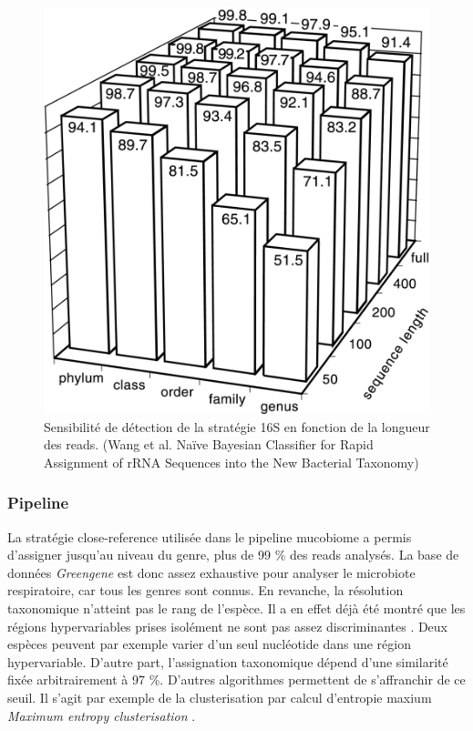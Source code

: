 \documentclass[12pt,a4paper]{article}
\begin{document}
\begin{figure}
\begin{center}
\includegraphics[scale=3]{img/zam.jpg}\hfill
\end{center}
\caption{Sensibilité de détection de la stratégie 16S en fonction de la longueur des reads. (Wang et al. Naïve Bayesian Classifier for Rapid Assignment of rRNA Sequences into the New Bacterial Taxonomy) }
\label{rnasens}
\end{figure}

\subsubsection{Pipeline}
La stratégie close-reference utilisée dans le pipeline mucobiome a permis d'assigner jusqu'au niveau du genre, plus de 99 \% des reads analysés. La base de données \textit{Greengene} est donc assez exhaustive pour analyser le microbiote respiratoire, car tous les genres sont connus.
En revanche, la résolution taxonomique n'atteint pas le rang de l'espèce. Il a en effet déjà été montré que les régions hypervariables prises isolément ne sont pas assez discriminantes \cite{Yang2016}. Deux espèces peuvent par exemple varier d'un seul nucléotide dans une région hypervariable.
D'autre part, l'assignation taxonomique dépend d'une similarité fixée arbitrairement à 97 \%. D'autres algorithmes permettent de s'affranchir de ce seuil. Il s'agit par exemple de la clusterisation par calcul d'entropie maxium \textit{Maximum entropy clusterisation} \cite{Bobadilla2015}.
\end{document}
